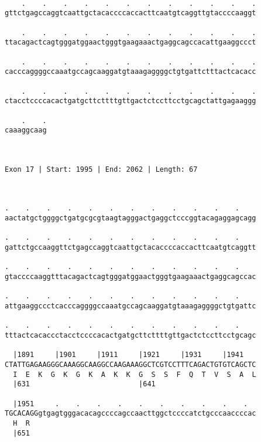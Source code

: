 \documentclass{article}
\begin{document}
\begin{Verbatim}
  
    .    .    .    .    .    .    .    .    .    .    .    .
gttctgagccaggtcaattgctacaccccaccacttcaatgtcaggttgtaccccaaggt
                                                            
    .    .    .    .    .    .    .    .    .    .    .    .
ttacagactcagtgggatggaactgggtgaagaaactgaggcagccacattgaaggccct
                                                            
    .    .    .    .    .    .    .    .    .    .    .    .
cacccaggggccaaatgccagcaaggatgtaaagaggggctgtgattctttactcacacc
                                                            
    .    .    .    .    .    .    .    .    .    .    .    .
ctacctccccacactgatgcttcttttgttgactctccttcctgcagctattgagaaggg
                                                            
    .    .
caaaggcaag
          
          
 
Exon 17 | Start: 1995 | End: 2062 | Length: 67



.    .    .    .    .    .    .    .    .    .    .    .    
aactatgctggggctgatgcgcgtaagtagggactgaggctcccggtacagaggagcagg
                                                            
.    .    .    .    .    .    .    .    .    .    .    .    
gattctgccaaggttctgagccaggtcaattgctacaccccaccacttcaatgtcaggtt
                                                            
.    .    .    .    .    .    .    .    .    .    .    .    
gtaccccaaggtttacagactcagtgggatggaactgggtgaagaaactgaggcagccac
                                                            
.    .    .    .    .    .    .    .    .    .    .    .    
attgaaggccctcacccaggggccaaatgccagcaaggatgtaaagaggggctgtgattc
                                                            
.    .    .    .    .    .    .    .    .    .    .    .    
tttactcacaccctacctccccacactgatgcttcttttgttgactctccttcctgcagc
                                                            
  |1891     |1901     |1911     |1921     |1931     |1941   
CTATTGAGAAGGGCAAAGGCAAGGCCAAGAAAGGCTCGTCCTTTCAGACTGTGTCAGCTC
  I  E  K  G  K  G  K  A  K  K  G  S  S  F  Q  T  V  S  A  L
  |631                          |641                        
  
  |1951     .    .    .    .    .    .    .    .    .    .  
TGCACAGGgtgagtgggacacagccccagccaacttggctccccatctgcccaaccccac
  H  R                                                      
  |651                                                      
  

\end{Verbatim}
\end{document}
